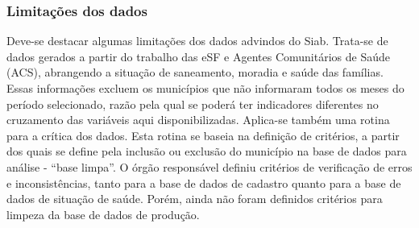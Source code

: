 \documentclass[twoside,onecolumn,12pt]{article}
\numberwithin{outputctr}{section}
\begin{document}

\subsubsection{Limitações dos dados}

Deve-se destacar algumas limita\c{c}\~{o}es dos dados advindos do Siab. Trata-se de dados gerados a partir do trabalho das eSF e Agentes Comunit\'{a}rios de Sa\'{u}de (ACS), abrangendo a situa\c{c}\~{a}o de saneamento,  moradia e sa\'{u}de das fam\'{i}lias. Essas informa\c{c}\~{o}es excluem os munic\'{i}pios que n\~{a}o informaram todos os meses do per\'{i}odo selecionado, raz\~{a}o pela qual se poder\'{a} ter indicadores diferentes no cruzamento das vari\'{a}veis aqui disponibilizadas. Aplica-se tamb\'{e}m uma rotina para a cr\'{i}tica dos dados. Esta rotina se baseia na defini\c{c}\~{a}o de crit\'{e}rios, a partir dos quais se define pela inclus\~{a}o ou exclus\~{a}o do munic\'{i}pio na base de dados para an\'{a}lise - ``base limpa''. O \'{o}rg\~{a}o respons\'{a}vel definiu crit\'{e}rios de verifica\c{c}\~{a}o de erros e inconsist\^{e}ncias, tanto para a base de dados de cadastro quanto para a base de dados de situa\c{c}\~{a}o de sa\'{u}de. Por\'{e}m, ainda n\~{a}o foram definidos crit\'{e}rios para limpeza da base de dados de produ\c{c}\~{a}o.
\end{document}
